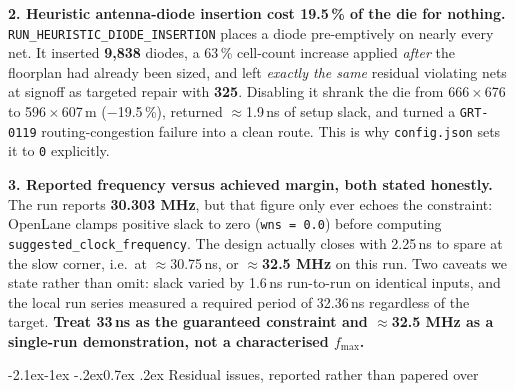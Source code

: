 \documentclass[11pt,a4paper]{article}
\makeatletter
\renewcommand\subsection{\@startsection{subsection}{2}{\z@}%
  {-2.1ex\@plus -1ex \@minus -.2ex}{0.7ex \@plus .2ex}%
  {\color{rvbldark}\normalfont\normalsize\bfseries}}
\makeatother
\begin{document}
\begin{minipage}[t]{0.485\linewidth}
\vspace{0pt}
\textbf{2. Heuristic antenna-diode insertion cost 19.5\,\% of the die for nothing.}
\texttt{RUN\_HEURISTIC\_DIODE\_INSERTION} places a diode pre-emptively on nearly every net.
It inserted \textbf{9{,}838} diodes, a 63\,\% cell-count increase applied \emph{after} the
floorplan had already been sized, and left \emph{exactly the same} residual violating nets
at signoff as targeted repair with \textbf{325}. Disabling it shrank the die from
666\,$\times$\,676 to 596\,$\times$\,607\,\textmu m ($-$19.5\,\%), returned $\approx$1.9\,ns
of setup slack, and turned a \texttt{GRT-0119} routing-congestion failure into a clean route.
This is why \texttt{config.json} sets it to \texttt{0} explicitly.

\vspace{3pt}
\textbf{3. Reported frequency versus achieved margin, both stated honestly.} The run reports
\textbf{30.303 MHz}, but that figure only ever echoes the constraint: OpenLane clamps
positive slack to zero (\texttt{wns = 0.0}) before computing
\texttt{suggested\_clock\_frequency}. The design actually closes with 2.25\,ns to spare at
the slow corner, i.e.\ at $\approx$30.75\,ns, or \textbf{$\approx$32.5 MHz} on this run.
Two caveats we state rather than omit: slack varied by 1.6\,ns run-to-run on identical
inputs, and the local run series measured a required period of 32.36\,ns regardless of the
target. \textbf{Treat 33\,ns as the guaranteed constraint and $\approx$32.5 MHz as a
single-run demonstration, not a characterised $f_\text{max}$.}
\end{minipage}

\subsection{Residual issues, reported rather than papered over}
\end{document}
